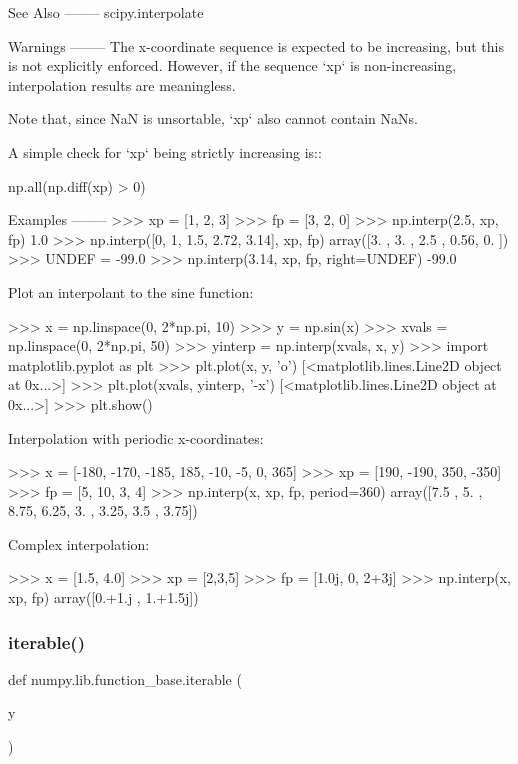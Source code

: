 \begin{DoxyVerb}
See Also
--------
scipy.interpolate

Warnings
--------
The x-coordinate sequence is expected to be increasing, but this is not
explicitly enforced.  However, if the sequence `xp` is non-increasing,
interpolation results are meaningless.

Note that, since NaN is unsortable, `xp` also cannot contain NaNs.

A simple check for `xp` being strictly increasing is::

    np.all(np.diff(xp) > 0)

Examples
--------
>>> xp = [1, 2, 3]
>>> fp = [3, 2, 0]
>>> np.interp(2.5, xp, fp)
1.0
>>> np.interp([0, 1, 1.5, 2.72, 3.14], xp, fp)
array([3.  , 3.  , 2.5 , 0.56, 0.  ])
>>> UNDEF = -99.0
>>> np.interp(3.14, xp, fp, right=UNDEF)
-99.0

Plot an interpolant to the sine function:

>>> x = np.linspace(0, 2*np.pi, 10)
>>> y = np.sin(x)
>>> xvals = np.linspace(0, 2*np.pi, 50)
>>> yinterp = np.interp(xvals, x, y)
>>> import matplotlib.pyplot as plt
>>> plt.plot(x, y, 'o')
[<matplotlib.lines.Line2D object at 0x...>]
>>> plt.plot(xvals, yinterp, '-x')
[<matplotlib.lines.Line2D object at 0x...>]
>>> plt.show()

Interpolation with periodic x-coordinates:

>>> x = [-180, -170, -185, 185, -10, -5, 0, 365]
>>> xp = [190, -190, 350, -350]
>>> fp = [5, 10, 3, 4]
>>> np.interp(x, xp, fp, period=360)
array([7.5 , 5.  , 8.75, 6.25, 3.  , 3.25, 3.5 , 3.75])

Complex interpolation:

>>> x = [1.5, 4.0]
>>> xp = [2,3,5]
>>> fp = [1.0j, 0, 2+3j]
>>> np.interp(x, xp, fp)
array([0.+1.j , 1.+1.5j])\end{DoxyVerb}
 \mbox{\label{namespacenumpy_1_1lib_1_1function__base_a368079157e5bbf6d150b0180349244e8}} 
\subsubsection{\texorpdfstring{iterable()}{iterable()}}
{\footnotesize\ttfamily def numpy.\+lib.\+function\+\_\+base.\+iterable (\begin{DoxyParamCaption}\item[{}]{y }\end{DoxyParamCaption})}

